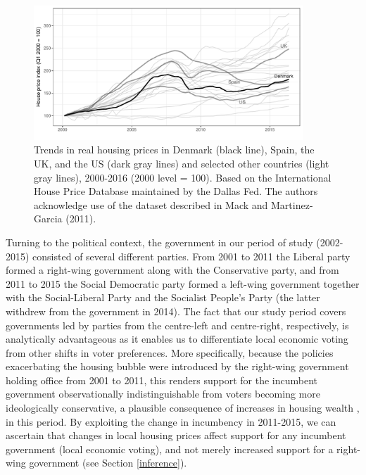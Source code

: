 \documentclass[12pt,a4paper]{article}
\begin{document}
	\begin{figure}[htbp!]
		\includegraphics[width=0.9\textwidth]{../figures/timeplot}
		\centering
		\caption{Trends in real housing prices in Denmark (black line), Spain, the UK, and the US (dark gray lines) and selected other countries (light gray lines), 2000-2016 (2000 level = 100). Based on the International House Price Database maintained by the Dallas Fed. The authors acknowledge use of the dataset described in Mack and Martinez-Garcia (2011).}\label{hpd}
	\end{figure}
	
	Turning to the political context, the government in our period of study (2002-2015) consisted of several different parties. From 2001 to 2011 the Liberal party formed a right-wing government along with the Conservative party, and from 2011 to 2015 the Social Democratic party formed a left-wing government together with the Social-Liberal Party and the Socialist People’s Party (the latter withdrew from the government in 2014). The fact that our study period covers governments led by parties from the centre-left and centre-right, respectively, is analytically advantageous as it enables us to differentiate local economic voting from other shifts in voter preferences. More specifically, because the policies exacerbating the housing bubble were introduced by the right-wing government holding office from 2001 to 2011, this renders support for the incumbent government observationally indistinguishable from voters becoming more ideologically conservative, a plausible consequence of increases in housing wealth \citep{ansell2014political}, in this period. By exploiting the change in incumbency in 2011-2015, we can ascertain that changes in local housing prices affect support for any incumbent government (local economic voting), and not merely increased support for a right-wing government (see Section \ref{inference}). 
	
\end{document}
